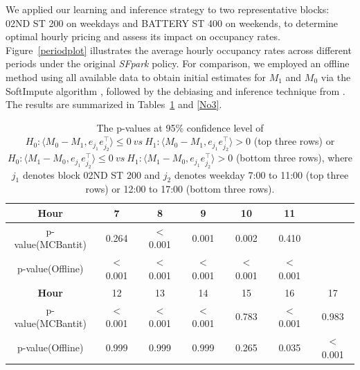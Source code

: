 \documentclass[12pt]{article}
\newcommand{\inp}[2]{\langle #1,#2\rangle}
\theoremstyle{plain}
\begin{document}
We applied our learning and inference strategy to two representative blocks: 02ND ST 200 on weekdays and BATTERY ST 400 on weekends, to determine optimal hourly pricing and assess its impact on occupancy rates. Figure~\ref{periodplot} illustrates the average hourly occupancy rates across different periods under the original \emph{SFpark} policy. For comparison, we employed an offline method using all available data to obtain initial estimates for $M_1$ and $M_0$ via the SoftImpute algorithm \citep{mazumder2010spectral}, followed by the debiasing and inference technique from \cite{ma2023multiple}. The results are summarized in Tables~\ref{No2} and \ref{No3}.


\begin{table} [h]
    \caption{\label{No2} The p-values at 95\% confidence level of $H_0:\inp{M_0-M_1}{e_{j_1}e_{j_2}^{\top}}\leq 0 \  vs\  H_1:\inp{M_0-M_1}{e_{j_1}e_{j_2}^{\top}}> 0$ (top three rows) or $H_0:\inp{M_1-M_0}{e_{j_1}e_{j_2}^{\top}}\leq 0 \  vs\  H_1:\inp{M_1-M_0}{e_{j_1}e_{j_2}^{\top}}> 0$ (bottom three rows), where $j_1$ denotes block 02ND ST 200 and $j_2$ denotes weekday 7:00 to 11:00 (top three rows) or  12:00 to 17:00 (bottom three rows).}
    \centering
    \begin{tabular}{ccccccc} 
        \toprule 
        \textbf{Hour} & 7 & 8 & 9 & 10 & 11 \\  
        \midrule 
        p-value(MCBantit) & 0.264 & $<$0.001 & 0.001 & 0.002 & 0.410 \\
        p-value(Offline) & $<$0.001 & $<$0.001 & $<$0.001 & $<$0.001 & $<$0.001 \\
        \hline\hline
        \textbf{Hour} & 12 & 13 & 14 & 15 & 16 & 17 \\  
        \midrule 
        p-value(MCBantit) & $<$0.001 & $<$0.001 & $<$0.001 & 0.783 & $<$0.001 & 0.983 \\
        p-value(Offline) & 0.999 & 0.999 & 0.999 & 0.265 & 0.035 & $<$0.001 \\
        \bottomrule
    \end{tabular}%
\end{table}
\end{document}
